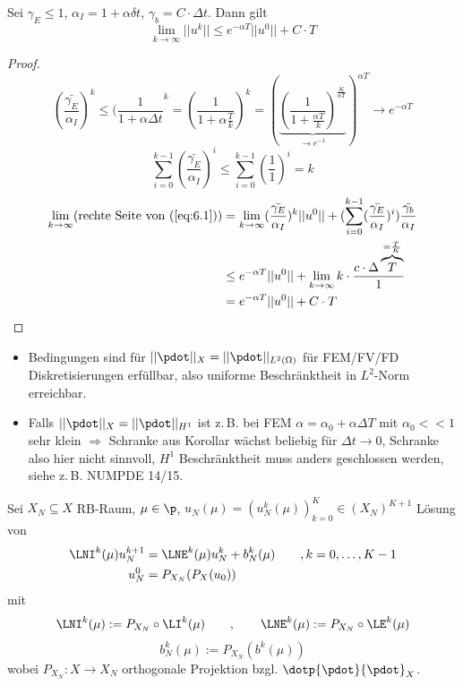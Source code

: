 \begin{kor} \label{6.3}
Sei $\gamma_E \leq 1$, $\alpha_I = 1 + \alpha \delta t$, $\gamma_b = C \cdot \Delta t$. Dann gilt
\[
	\lim\limits_{k \rightarrow \infty} ||u^k|| \leq e^{-\alpha T} ||u^0|| + C \cdot T
\]
\begin{proof}
	\[
		(\frac{\bar{\gamma_E}}{\alpha_I})^k \leq (\frac{1}{1+\alpha \Delta t}^k = (\frac{1}{1+\alpha \frac{T}{k}})^k = (\underbrace{(\frac{1}{1+\frac{\alpha T}{k}})^{\frac{K}{\alpha T}}}_{\rightarrow e^{-1}})^{\alpha T} \rightarrow e^{- \alpha T}
	\]
	\[
		\sum\limits_{i=0}^{k-1} (\frac{\bar{\gamma_E}}{\alpha_I})^i \leq \sum\limits_{i=0}^{k-1} (\frac{1}{1})^i = k
	\]
	\begin{align*}
	\lim\limits_{k \rightarrow \infty} (\text{rechte Seite von  (\ref{eq:6.1})}) &= \lim\limits_{k \rightarrow \infty} (\frac{\bar{\gamma_E}}{\alpha_I})^k ||u^0|| + (\sum\limits_{i=0}^{k-1}(\frac{\bar{\gamma_E}}{\alpha_I})^i)\frac{\bar{\gamma_b}}{\alpha_I} \\
	& \leq e^{- \alpha T} ||u^0|| + \lim\limits_{k \rightarrow \infty} k \cdot \frac{c \cdot \Delta \overbrace{T}^{=\frac{T}{K}}}{1} \\
	&= e^{- \alpha T} ||u^0|| + C \cdot T
	\end{align*}
\end{proof}
\end{kor}

\begin{bem} \beginwithlistbem
	\begin{itemize}
		\item Bedingungen sind für $||\pdot||_X = || \pdot ||_{L^2(\Omega)}$ für FEM/FV/FD Diskretisierungen erfüllbar, also uniforme Beschränktheit in $L^2$-Norm erreichbar.
		\item Falls $|| \pdot ||_X = || \pdot ||_{H^1}$ ist z.\,B. bei FEM $\alpha = \alpha_0 + \alpha \Delta T$ mit $\alpha_0 << 1$ sehr klein $\Rightarrow$ Schranke aus Korollar wächst beliebig für $\Delta t \rightarrow 0$, Schranke also hier nicht sinnvoll, $H^1$ Beschränktheit muss anders geschlossen werden, siehe z.\,B. NUMPDE 14/15.
	\end{itemize}
\end{bem}

\begin{defn}
Sei $X_N \subseteq X$ RB-Raum, $\mu \in \p$, $u_N (\mu) = (u_N^k (\mu))_{k=0}^K \in (X_N)^{K+1}$ Lösung von 
\begin{align*}
		\LNI^k(\mu) u_N^{k+1} &= \LNE^k(\mu) u_N^k + b_N^k(\mu) \qquad ,k=0,\dots,K-1 \\
		u_N^0 &= P_{X_N}(P_X(u_0))
\end{align*}
mit
\[
\LNI^k(\mu) := P_{X_N} \circ \LI^k(\mu) \qquad , \qquad \LNE^k(\mu) := P_{X_N} \circ \LE^k(\mu)
\]
\[
	b_N^k(\mu) := P_{X_N} (b^k(\mu))
\]
wobei $P_{X_N}: X \rightarrow X_N$ orthogonale Projektion bzgl. $\dotp{\pdot}{\pdot}_X$.
\end{defn}

